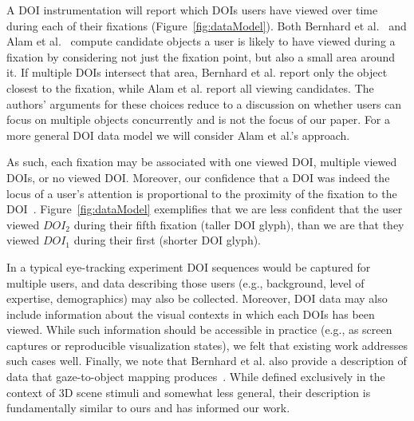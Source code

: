 A DOI instrumentation will report which DOIs users have viewed over time during each of their fixations (Figure~\ref{fig:dataModel}). Both Bernhard et al.~\cite{bernhard2014gaze} and Alam et al.~\cite{alam15analyzing} compute candidate objects a user is likely to have viewed during a fixation by considering not just the fixation point, but also a small area around it.  If multiple DOIs intersect that area, Bernhard et al. report only the object closest to the fixation, while Alam et al. report all viewing candidates.  The authors' arguments for these choices reduce to a discussion on whether users can focus on multiple objects concurrently and is not the focus of our paper. For a more general DOI data model we will consider Alam et al.'s approach. 

As such, each fixation may be associated with one viewed DOI, multiple viewed DOIs, or no viewed DOI. Moreover, our confidence that a DOI was indeed the locus of a user's attention is proportional to the proximity of the fixation to the DOI~\cite{alam15analyzing}. Figure~\ref{fig:dataModel} exemplifies that we are less confident that the user viewed $DOI_2$ during their fifth fixation (taller DOI glyph), than we are that they viewed $DOI_1$ during their first (shorter DOI glyph). 

In a typical eye-tracking experiment DOI sequences would be captured for multiple users, and data describing those users (e.g., background, level of expertise, demographics) may also be collected. Moreover, DOI data may also include information about the visual contexts in which each DOIs has been viewed.  While such information should be accessible in practice (e.g., as screen captures or reproducible visualization states), we felt that existing work addresses such cases well. Finally, we note that Bernhard et al. also provide a description of data that gaze-to-object mapping produces~\cite{bernhard2014gaze}. While defined exclusively in the context of 3D scene stimuli and somewhat less general, their description is fundamentally similar to ours and has informed our work. 


